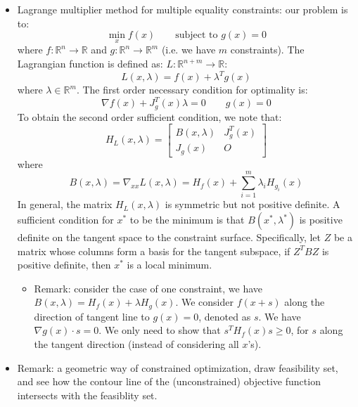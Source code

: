 \documentclass{report}
\begin{document}
\begin{itemize}
	\item Lagrange multiplier method for multiple equality constraints: our problem is to: 
	\begin{equation}
	\min_x f(x) \qquad \text{subject to } g(x) = 0
	\end{equation}
	where $f: \mathbb{R}^n \to \mathbb{R}$ and $g: \mathbb{R}^n \to \mathbb{R}^m$ (i.e. we have $m$ constraints). The Lagrangian function is defined as: $L: \mathbb{R}^{n+m} \to \mathbb{R}$: 
	\begin{equation}
	L(x,\lambda) = f(x) + \lambda^T g(x)
	\end{equation}
	where $\lambda \in \mathbb{R}^m$. The first order necessary condition for optimality is: 
	\begin{equation}
	\nabla f(x) + J_g^T(x) \lambda = 0 \qquad g(x) = 0
	\label{eq:Lagrange_first_order}
	\end{equation}
	To obtain the second order sufficient condition, we note that: 
	\begin{equation}
	H_L(x, \lambda) = \left[
	\begin{array}{ll}
	B(x, \lambda) & J_g^T(x)\\
	J_g(x) & O
	\end{array}
	\right]
	\end{equation}
	where 
	\begin{equation}
	B(x, \lambda) = \nabla_{xx} L(x,\lambda) = H_f(x) + \sum_{i=1}^m \lambda_i H_{g_i}(x)
	\end{equation}
	In general, the matrix $H_L(x, \lambda)$ is symmetric but not positive definite. A sufficient condition for $x^*$ to be the minimum is that $B(x^*, \lambda^*)$ is positive definite on the tangent space to the constraint surface. Specifically, let $Z$ be a matrix whose columns form a basis for the tangent subspace, if $Z^T B Z$ is positive definite, then $x^*$ is a local minimum. 
	\begin{itemize}
		\item Remark: consider the case of one constraint, we have $B(x, \lambda) = H_f(x) + \lambda H_g(x)$. We consider $f(x+s)$ along the direction of tangent line to $g(x) = 0$, denoted as $s$. We have $\nabla g(x) \cdot s = 0$. We only need to show that $s^T H_f(x) s \geq 0$, for $s$ along the tangent direction (instead of considering all $x$'s). 
	\end{itemize}
	
	\item Remark: a geometric way of constrained optimization, draw feasibility set, and see how the contour line of the (unconstrained) objective function intersects with the feasiblity set. 
\end{itemize}
\end{document}
